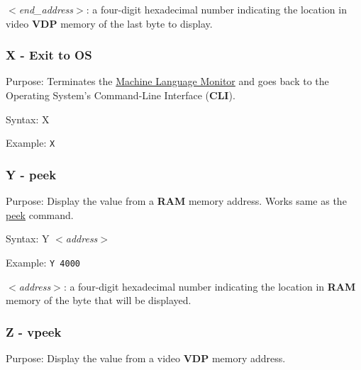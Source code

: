         \hspace{1cm}\textit{$<$end\_address$>$}: a four-digit hexadecimal
        number indicating the location in video \textbf{VDP} memory of the last
        byte to display.

        \subsubsection{X - Exit to OS}

        Purpose: Terminates the \hyperref[software:mlmonitor]
        {Machine Language Monitor} and goes back to the Operating System's
        Command-Line Interface (\textbf{CLI}).

        Syntax: X

        Example: \texttt{X}

        \subsubsection{Y - peek}

        Purpose: Display the value from a \textbf{RAM} memory address. Works
        same as the \hyperref[cmd:peek]{peek} command.

        Syntax: Y \textit{$<$address$>$}

        Example: \texttt{Y 4000}

        \hspace{1cm}\textit{$<$address$>$}: a four-digit hexadecimal number
        indicating the location in \textbf{RAM} memory of the byte that will be
        displayed.

        \subsubsection{Z - vpeek}

        Purpose: Display the value from a video \textbf{VDP} memory address.

